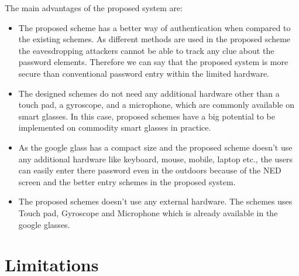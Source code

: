 \documentclass[12pt,a4paper,oneside]{report}
\begin{document}
The main advantages of the proposed system are: \begin{itemize}
    \item The proposed scheme has a better way of authentication when compared to the existing schemes. As different methods are used in the proposed scheme  the eavesdropping attackers cannot be able to track any clue about the password elements. Therefore we can say that the proposed system is more secure than conventional password entry within the limited hardware.
    \item The designed
schemes do not need any additional hardware other than
a touch pad, a gyroscope, and a microphone, which
are commonly available on smart glasses. In this case,
proposed schemes have a big potential to be implemented on
commodity smart glasses in practice.
\item As the google glass has a compact size and the proposed scheme doesn't use any additional hardware like keyboard, mouse, mobile, laptop etc., the users can easily enter there password even in the outdoors because of the NED screen and the better entry schemes in the proposed system.
\item The proposed schemes doesn't use any external hardware. The schemes uses Touch pad, Gyroscope and Microphone which is already available in the google glasses.
\end{itemize}

\section{Limitations}
\end{document}
